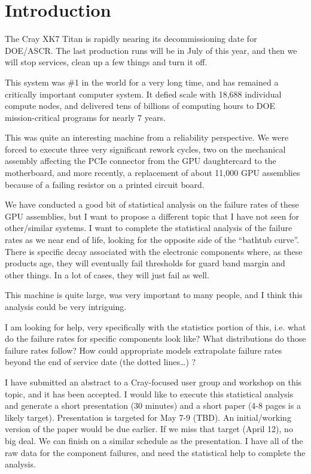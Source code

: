 \section{Introduction}
\label{sec:intro}
The Cray XK7 Titan is rapidly nearing its decommissioning date for
DOE/ASCR. The last production runs will be in July of this year, and
then we will stop services, clean up a few things and turn it off. 
 
This system was \#1 in the world for a very long time, and has remained
a critically important computer system. It defied scale with 18,688
individual compute nodes, and delivered tens of billions of computing
hours to DOE mission-critical programs for nearly 7 years. 
 
This was quite an interesting machine from a reliability perspective.
We were forced to execute three very significant rework cycles, two on
the mechanical assembly affecting the PCIe connector from the GPU
daughtercard to the motherboard, and more recently, a replacement of
about 11,000 GPU assemblies because of a failing resistor on a printed
circuit board. 
 
We have conducted a good bit of statistical analysis on the failure
rates of these GPU assemblies, but I want to propose a different topic
that I have not seen for other/similar systems.  I want to complete
the statistical analysis of the failure rates as we near end of life,
looking for the opposite side of the “bathtub curve”.  There is
specific decay associated with the electronic components where, as
these products age, they will eventually fail thresholds for guard
band margin and other things. In a lot of cases, they will just fail
as well. 
 
This machine is quite large, was very important to many people, and I
think this analysis could be very intriguing. 
 
I am looking for help, very specifically with the statistics portion
of this, i.e. what do the failure rates for specific components look
like? What distributions do those failure rates follow? How could
appropriate models extrapolate failure rates beyond the end of service
date (the dotted lines…) ? 
 
I have submitted an abstract to a Cray-focused user group and workshop
on this topic, and it has been accepted.  I would like to execute this
statistical analysis and generate a short presentation (30 minutes)
and a short paper (4-8 pages is a likely target).  Presentation is
targeted for May 7-9 (TBD). An initial/working version of the paper
would be due earlier. If we miss that target (April 12), no big
deal. We can finish on a similar schedule as the presentation.  I have
all of the raw data for the component failures, and need the
statistical help to complete the analysis. 
 
